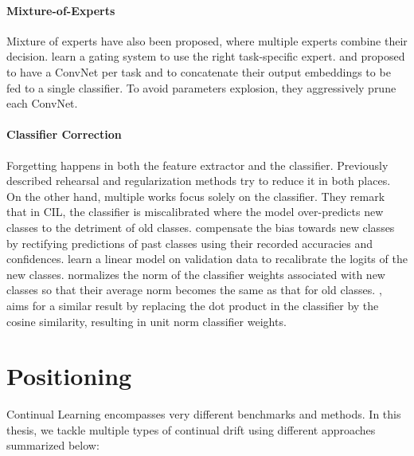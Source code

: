 \paragraph{Mixture-of-Experts} Mixture of experts \citep{masoudnia2014mixture} have also been
proposed, where multiple experts combine their decision. \cite{aljundi2017experts} learn a gating
system to use the right task-specific expert. \cite{yan2021der} and \cite{li2021preserve} proposed
to have a \ac{ConvNet} per task and to concatenate their output embeddings to be fed to a single
classifier. To avoid parameters explosion, they aggressively prune each \ac{ConvNet}.

\paragraph{Classifier Correction} Forgetting happens in both the feature extractor and the
classifier. Previously described rehearsal and regularization methods try to reduce it in both
places. On the other hand, multiple works focus solely on the classifier. They remark that in
\acf{CIL}, the classifier is miscalibrated \citep{guo2017miscalibration} where the model
over-predicts new classes to the detriment of old classes. \cite{belouadah2019il2m} compensate the
bias towards new classes by rectifying predictions of past classes using their recorded accuracies
and confidences. \cite{wu2019bias_correction} learn a linear model on validation data to recalibrate
the logits of the new classes. \cite{zhao2020weightalignement} normalizes the norm of the classifier
weights associated with new classes so that their average norm becomes the same as that for old
classes. \cite{hou2019ucir}, aims for a similar result by replacing the dot product in the
classifier by the cosine similarity, resulting in unit norm classifier weights.

\section{Positioning}

Continual Learning encompasses very different benchmarks and methods. In this thesis, we tackle
multiple types of continual drift using different approaches summarized below:

